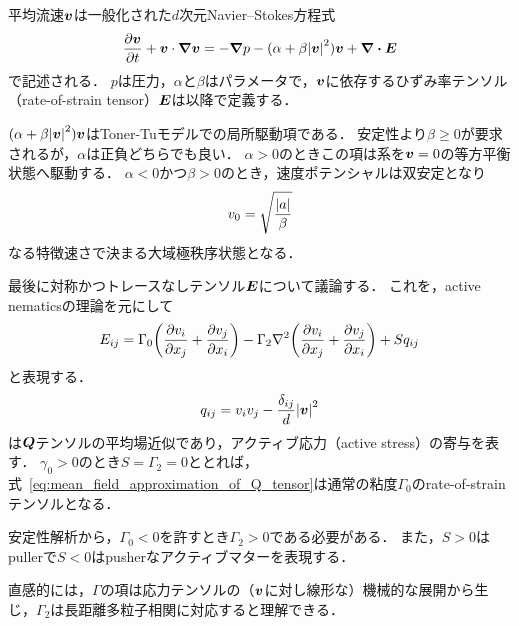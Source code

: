 \documentclass[12pt,dvipdfmx,svgnames,a4paper,uplatex]{ujarticle}
\theoremstyle{plain}
\begin{document}
平均流速\(\vb*{v}\)は一般化された\(d\)次元Navier--Stokes方程式
\begin{equation}
  \pdv{\vb*{v}}{t} + \vb*{v} \cdot \grad \vb*{v} = -\grad p - (\alpha + \beta \abs{\vb*{v}}^2) \vb*{v} + \div \vb*{E}
  \label{eq:generalized_NS}
\end{equation}
で記述される．
\(p\)は圧力，\(\alpha\)と\(\beta\)はパラメータで，\(\vb*{v}\)に依存するひずみ率テンソル（rate-of-strain tensor）\(\vb*{E}\)は以降で定義する．

\((\alpha + \beta \abs{\vb*{v}}^2) \vb*{v}\)はToner-Tuモデルでの局所駆動項である．
安定性より\(\beta \ge 0\)が要求されるが，\(\alpha\)は正負どちらでも良い．
\(\alpha > 0\)のときこの項は系を\(\vb*{v}=0\)の等方平衡状態へ駆動する．
\(\alpha < 0\)かつ\(\beta > 0\)のとき，速度ポテンシャルは双安定となり
\begin{equation}
  v_0 = \sqrt{\frac{\abs{a}}{\beta}}
  \label{eq:bistable_velocity_potential}
\end{equation}
なる特徴速さで決まる大域極秩序状態となる．

最後に対称かつトレースなしテンソル\(\vb*{E}\)について議論する．
これを，active nematicsの理論を元にして
\begin{equation}
  E_{ij} = \Gamma_0 \qty(\pdv{v_i}{x_j} + \pdv{v_j}{x_i}) - \Gamma_2 \laplacian \qty(\pdv{v_i}{x_j} + \pdv{v_j}{x_i}) + S q_{ij}
  \label{eq:rate-of-strain_tensor}
\end{equation}
と表現する．
\begin{equation}
  q_{ij} = v_i v_j - \frac{\delta_{ij}}{d} \abs{\vb*{v}}^2
  \label{eq:mean_field_approximation_of_Q_tensor}
\end{equation}
は\(\vb*{Q}\)テンソルの平均場近似であり，アクティブ応力（active stress）の寄与を表す．
\(\gamma_0 > 0\)のとき\(S=\Gamma_2=0\)ととれば，式~\ref{eq:mean_field_approximation_of_Q_tensor}は通常の粘度\(\Gamma_0\)のrate-of-strainテンソルとなる．

安定性解析から，\(\Gamma_0 < 0\)を許すとき\(\Gamma_2 > 0\)である必要がある．
また，\(S>0\)はpullerで\(S<0\)はpusherなアクティブマターを表現する．

直感的には，\(\Gamma\)の項は応力テンソルの（\(\vb*{v}\)に対し線形な）機械的な展開から生じ，\(\Gamma_2\)は長距離多粒子相関に対応すると理解できる．
\end{document}
